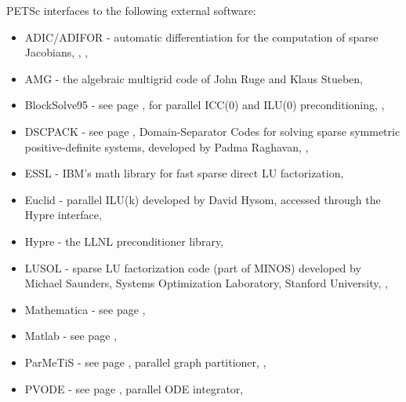 \vspace{.3in}
\noindent
PETSc interfaces to the following external software:
\begin{itemize}
  \item ADIC/ADIFOR -  automatic differentiation for the computation of sparse Jacobians, 
                     ,
                     ,
  \item AMG -         the algebraic multigrid code of John Ruge and Klaus Stueben,
  \item BlockSolve95 - see page \pageref{sec_blocksolve}, for parallel ICC(0) and ILU(0) preconditioning,
                     ,
  \item DSCPACK -    see page \pageref{sec_externalsol}, Domain-Separator Codes for solving sparse symmetric
                      positive-definite systems, 
                     developed by Padma Raghavan,   
                     ,
  \item ESSL -         IBM's math library for fast sparse direct LU factorization,
  \item Euclid  -   parallel ILU(k) developed by David Hysom, accessed through the Hypre interface,
  \item Hypre -    the LLNL preconditioner library,
  \item LUSOL -       sparse LU factorization code (part of MINOS) developed by Michael Saunders,
                      Systems Optimization Laboratory, Stanford University,
                     ,
  \item Mathematica -  see page \pageref{ch_mathematica},
  \item Matlab -      see page \pageref{ch_matlab},
  \item ParMeTiS -     see page \pageref{sec_partitioning}, parallel graph partitioner,
                     ,
  \item PVODE -       see page \pageref{sec_pvode}, parallel ODE integrator,

\end{itemize}
